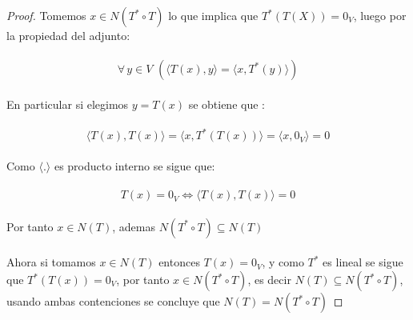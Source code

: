 \documentclass[11pt,letterpaper]{article}
\begin{document}
\begin{proof}
    Tomemos $x\in N(T^{*}\circ T)$ lo que implica que $T^{*}(T(X))=0_{V}$, luego por la propiedad del adjunto:\,\\
    \,\\
    \begin{equation*}
        \forall\,y\in V\,\,(\langle T(x),y \rangle=\langle x, T^{*}(y) \rangle)
    \end{equation*}\,\\
    En particular si elegimos $y=T(x)$ se obtiene que :\,\\
    \,\\
    \begin{equation*}
        \langle T(x),T(x) \rangle=\langle x, T^{*}(T(x)) \rangle=\langle x,0_{V} \rangle=0
    \end{equation*}\,\\
    Como $\langle . \rangle$ es producto interno se sigue que:\,\\
    \,\\
    \begin{equation*}
        T(x)=0_V \iff  \langle T(x),T(x) \rangle=0
    \end{equation*}\,\\
    Por tanto $x\in N(T)$, ademas $N(T^*\circ T)\subseteq N(T)$\,\\
    \,\\
    Ahora si tomamos $x\in N(T)$ entonces $T(x)=0_{V}$, y como $T^{*}$ es lineal se sigue que $T^{*}(T(x))=0_V$, por tanto $x\in N(T^*\circ T)$, es decir $N(T)\subseteq N(T^*\circ T)$, usando ambas contenciones
    se concluye que $N(T)=N(T^{*}\circ T)$ 
\end{proof}\,\\
\end{document}
